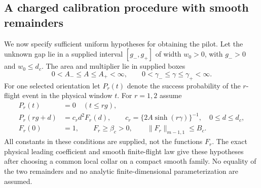 \subsection{A charged calibration procedure with smooth remainders}
We now specify sufficient uniform hypotheses for obtaining the pilot.
Let the unknown gap lie in a supplied interval $[g_-,g_+]$ of width
$w_0>0$, with $g_->0$ and $w_0\le d_c$. The area and multiplier
lie in supplied boxes
\[
 0<A_-\le A\le A_+<\infty,\qquad
 0<\gamma_-\le\gamma\le\gamma_+<\infty.
\]
For one selected orientation let $P_r(t)$ denote the success
probability of the $r$-flight event in the physical window $t$.
For $r=1,2$ assume
\begin{equation}\label{eq:v11-calibration-model}
 \begin{split}
 P_r(t)&=0\quad(t\le rg),\\
 P_r(rg+d)&=c_r d^2F_r(d),\qquad
 c_r=\{2A\sinh(r\gamma)\}^{-1},\quad0\le d\le d_c,\\
 F_r(0)&=1,\qquad F_r\ge\beta_c>0,\qquad
                       \|F_r\|_{m-1,1}\le B_c.
 \end{split}
\end{equation}
All constants in these conditions are supplied, not the functions
$F_r$. The exact physical leading coefficient and smooth finite-flight
law give these hypotheses after choosing a common local collar on a
compact smooth family. No equality of the two remainders and no
analytic finite-dimensional parameterization are assumed.

